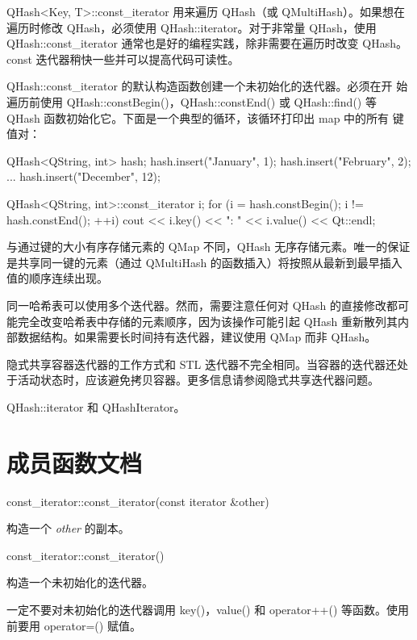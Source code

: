 QHash<Key, T>::const\_iterator 用来遍历 QHash（或 QMultiHash）。如果想在遍历时修改 QHash，必须使用 QHash::iterator。对于非常量 QHash，使用 QHash::const\_iterator 通常也是好的编程实践，除非需要在遍历时改变 QHash。const 迭代器稍快一些并可以提高代码可读性。

QHash::const\_iterator 的默认构造函数创建一个未初始化的迭代器。必须在开
始遍历前使用 QHash::constBegin()，QHash::constEnd() 或 QHash::find()
等 QHash 函数初始化它。下面是一个典型的循环，该循环打印出 map 中的所有
键值对：

\begin{cppcode}
QHash<QString, int> hash;
hash.insert("January", 1);
hash.insert("February", 2);
...
hash.insert("December", 12);

QHash<QString, int>::const_iterator i;
for (i = hash.constBegin(); i != hash.constEnd(); ++i)
    cout << i.key() << ": " << i.value() << Qt::endl;
\end{cppcode}

与通过键的大小有序存储元素的 QMap 不同，QHash 无序存储元素。唯一的保证是共享同一键的元素（通过 QMultiHash 的函数插入）将按照从最新到最早插入值的顺序连续出现。

同一哈希表可以使用多个迭代器。然而，需要注意任何对 QHash 的直接修改都可能完全改变哈希表中存储的元素顺序，因为该操作可能引起 QHash 重新散列其内部数据结构。如果需要长时间持有迭代器，建议使用 QMap 而非 QHash。

\begin{notice}
	隐式共享容器迭代器的工作方式和 STL 迭代器不完全相同。当容器的迭代器还处于活动状态时，应该避免拷贝容器。更多信息请参阅隐式共享迭代器问题。
\end{notice}



\begin{seeAlso}
 QHash::iterator 和 QHashIterator。
\end{seeAlso}

\splitLine

\section{成员函数文档}

const\_iterator::const\_iterator(const iterator \&other)

构造一个 \emph{other} 的副本。

const\_iterator::const\_iterator()

构造一个未初始化的迭代器。

一定不要对未初始化的迭代器调用 key()，value() 和 operator++() 等函数。使用前要用 operator=() 赋值。

